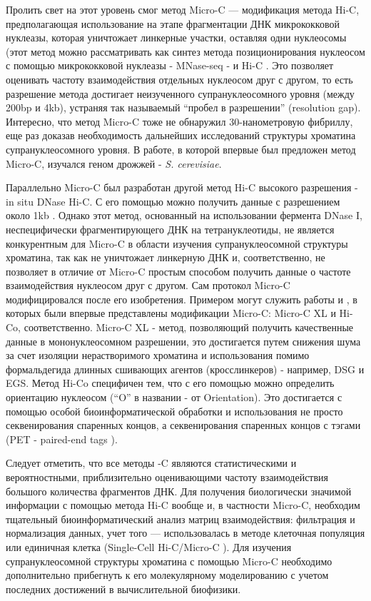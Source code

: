     Пролить свет на этот уровень смог метод Micro-C — модификация метода Hi-C, предполагающая использование на этапе фрагментации ДНК микрококковой нуклеазы, которая уничтожает линкерные участки, оставляя одни  нуклеосомы (этот метод можно рассматривать как синтез метода позиционирования нуклеосом с помощью микрококковой нуклеазы - MNase-seq \cite{cui_genome-wide_2012} - и Hi-C \cite{hsieh_mapping_2015}. Это позволяет оценивать частоту взаимодействия отдельных нуклеосом друг с другом, то есть разрешение метода достигает неизученного супрануклеосомного уровня (между 200bp и 4kb), устраняя так называемый ``пробел в разрешении'' (resolution gap). Интересно, что метод Micro-C тоже не обнаружил 30-нанометровую фибриллу, еще раз доказав необходимость дальнейших исследований структуры хроматина супрануклеосомного уровня. В работе, в которой впервые был предложен метод Micro-C, изучался геном дрожжей - \textit{S. cerevisiae}. 
    
    Параллельно Micro-C был разработан другой метод Hi-C высокого разрешения - in situ DNase Hi-C. С его помощью можно получить данные с разрешением около 1kb \cite{ramani_mapping_2016}. Однако этот метод, основанный на использовании фермента DNase I, неспецифически фрагментирующего ДНК на тетрануклеотиды, не является конкурентным для Micro-C в области изучения супрануклеосомной структуры хроматина, так как не уничтожает линкерную ДНК и, соответственно, не позволяет в отличие от Micro-C простым способом получить данные о частоте взаимодействия нуклеосом друг с другом. 
    Сам протокол Micro-C модифицировался после его изобретения. Примером могут служить работы \cite{hsieh_micro-c_2016} и \cite{ohno_sub-nucleosomal_2019}, в которых были впервые представлены модификации Micro-C:  Micro-C XL и Hi-Co, соответственно. Micro-C XL - метод, позволяющий получить качественные данные в мононуклеосомном разрешении, это достигается путем снижения шума за счет изоляции нерастворимого хроматина и использования помимо формальдегида длинных сшивающих агентов (кросслинкеров) - например, DSG и EGS. Метод Hi-Co специфичен тем, что с его помощью можно определить ориентацию нуклеосом (``O''  в названии - от Orientation). Это достигается с помощью особой биоинформатической обработки и использования не просто секвенирования спаренных концов, а секвенирования спаренных концов с тэгами (PET - paired-end tags \cite{fullwood_next-generation_2009}).
    
    
    
    Следует отметить, что все методы -C являются статистическими и вероятностными, приблизительно оценивающими частоту взаимодействия большого количества фрагментов ДНК. Для получения биологически значимой информации с помощью метода Hi-C вообще и, в частности Micro-C, необходим тщательный биоинформатический анализ матриц взаимодействия: фильтрация  и нормализация данных, учет того — использовалась в методе клеточная популяция или единичная клетка (Single-Cell Hi-C/Micro-C \cite{nagano_single-cell_2013}). Для изучения супрануклеосомной структуры хроматина с помощью Micro-C необходимо дополнительно прибегнуть к его молекулярному моделированию с учетом последних достижений в вычислительной биофизики.

